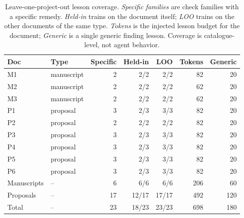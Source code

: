 \begin{table}[t]
\centering
\scriptsize
\caption{Leave-one-project-out lesson coverage. \emph{Specific families} are check families with a specific remedy. \emph{Held-in} trains on the document itself; \emph{LOO} trains on the other documents of the same type. \emph{Tokens} is the injected lesson budget for the document; \emph{Generic} is a single generic finding lesson. Coverage is catalogue-level, not agent behavior.}
\label{tab:transfer}
\begin{tabular}{@{}l l r r r r r@{}}
\toprule
Doc & Type & Specific & Held-in & LOO & Tokens & Generic \\
\midrule
M1 & manuscript & 2 & 2/2 & 2/2 & 82 & 20 \\
M2 & manuscript & 2 & 2/2 & 2/2 & 62 & 20 \\
M3 & manuscript & 2 & 2/2 & 2/2 & 62 & 20 \\
P1 & proposal & 3 & 2/3 & 3/3 & 82 & 20 \\
P2 & proposal & 2 & 2/2 & 2/2 & 82 & 20 \\
P3 & proposal & 3 & 2/3 & 3/3 & 82 & 20 \\
P4 & proposal & 3 & 2/3 & 3/3 & 82 & 20 \\
P5 & proposal & 3 & 2/3 & 3/3 & 82 & 20 \\
P6 & proposal & 3 & 2/3 & 3/3 & 82 & 20 \\
\midrule
Manuscripts & -- & 6 & 6/6 & 6/6 & 206 & 60 \\
Proposals & -- & 17 & 12/17 & 17/17 & 492 & 120 \\
Total & -- & 23 & 18/23 & 23/23 & 698 & 180 \\
\bottomrule
\end{tabular}
\end{table}
